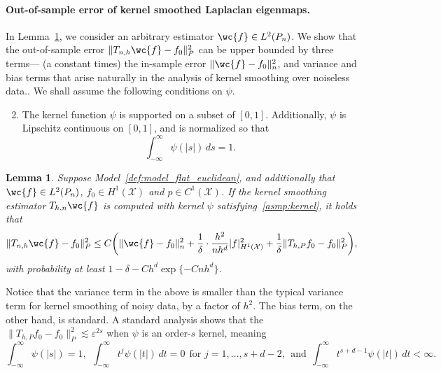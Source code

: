 \documentclass{article}
\newcommand{\1}{\mathbf{1}}
\newcommand{\mc}[1]{\mathcal{#1}}
\theoremstyle{alden}
\theoremstyle{aldenthm}
\newtheorem{lemma}{Lemma}
\theoremstyle{definition}
\theoremstyle{remark}
\begin{document}
\paragraph{Out-of-sample error of kernel smoothed Laplacian eigenmaps.}

In Lemma~\ref{lem:kernel_smoothing_laplacian_eigenmaps}, we consider an arbitrary estimator $\wc{f} \in L^2(P_n)$. We show that the out-of-sample error $\|T_{n,h}\wc{f} - f_0\|_P^2$ can be upper bounded by three terms--- (a constant times) the in-sample error $\|\wc{f} - f_0\|_n^2$, and variance and bias terms that arise naturally in the analysis of kernel smoothing over noiseless data.. We shall assume the following conditions on $\psi$.
\begin{enumerate}[label=(K\arabic*)]
	\setcounter{enumi}{1}
	\item
	\label{asmp:kernel}
	The kernel function $\psi$ is supported on a subset of $[0,1]$. Additionally, $\psi$ is Lipschitz continuous on $[0,1]$, and is normalized so that
	\begin{equation*}
	\int_{-\infty}^{\infty} \psi(|s|) \,ds = 1.
	\end{equation*}
\end{enumerate}
\begin{lemma}
	\label{lem:kernel_smoothing_laplacian_eigenmaps}
	Suppose Model~\ref{def:model_flat_euclidean}, and additionally that $\wc{f} \in L^2(P_n)$, $f_0 \in H^1(\mc{X})$ and $p \in C^1(\mc{X})$. If the kernel smoothing estimator $T_{h,n}\wc{f}$ is computed with kernel $\psi$ satisfying~\ref{asmp:kernel}, it holds that
	\begin{equation}
	\label{eqn:kernel_smoothing_laplacian_eigenmaps}
	\|T_{n,h}\wc{f} - f_0\|_P^2 \leq C\biggl(\|\wc{f} - f_0\|_n^2 + \frac{1}{\delta} \cdot \frac{h^2}{nh^d} |f|_{H^1(\mc{X})}^2 + \frac{1}{\delta}\|T_{h,P}f_0 - f_0\|_P^2\biggr),
	\end{equation}
	with probability at least $1 - \delta - Ch^d\exp\{-Cnh^d\}$. 
\end{lemma}
Notice that the variance term in the above is smaller than the typical variance term for kernel smoothing of noisy data, by a factor of $h^2$. The bias term, on the other hand, is standard. A standard analysis shows that the $\|T_{h,P}f_0 - f_0\|_P^2 \lesssim \varepsilon^{2s}$ when $\psi$ is an order-$s$ kernel, meaning
\begin{equation*}
\int_{-\infty}^{\infty} \psi(|s|) = 1,~~\int_{-\infty}^{\infty} t^j \psi(|t|) \,dt = 0~~\textrm{for $j = 1,\ldots,s + d - 2$},~~\textrm{and}~~\int_{-\infty}^{\infty} t^{s + d - 1} \psi(|t|) \,dt < \infty.
\end{equation*}
\end{document}
